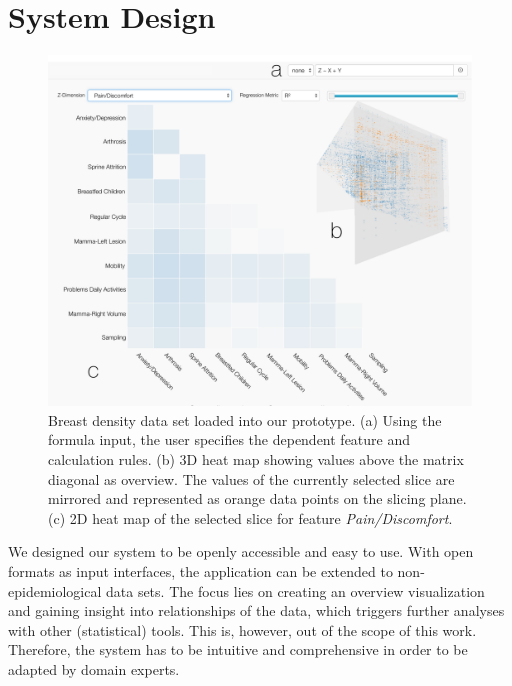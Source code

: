 \documentclass[journal]{style/vgtc} 			          %
\begin{document}
\section{System Design} \label{sec:SystemDesign}
\begin{figure}[htb]
 \centering
 \includegraphics[width=1.0\linewidth]{figures/system}
 \caption{
 Breast density data set loaded into our prototype.
 (a) Using the formula input, the user specifies the dependent feature and calculation rules.
 (b) 3D heat map showing values above the matrix diagonal as overview.
 The values of the currently selected slice are mirrored and represented as orange data points on the slicing plane.
 (c) 2D heat map of the selected slice for feature \emph{Pain/Discomfort}.
 }
  \label{fig:System}
\end{figure}
\noindent We designed our system to be openly accessible and easy to use.
With open formats as input interfaces, the application can be extended to non-epidemiological data sets.
The focus lies on creating an overview visualization and gaining insight into relationships of the data, which triggers further analyses with other (statistical) tools.
This is, however, out of the scope of this work.
Therefore, the system has to be intuitive and comprehensive in order to be adapted by domain experts.
\end{document}
